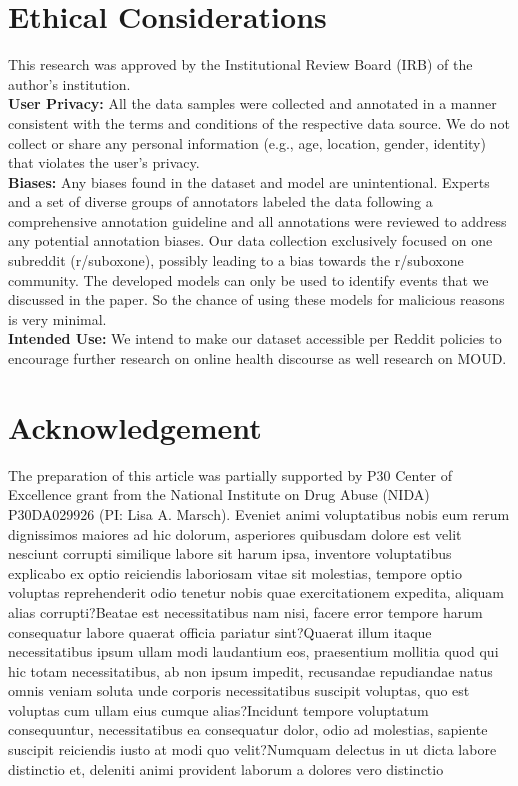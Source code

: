\documentclass[letterpaper]{article}
\begin{document}
\section{Ethical Considerations}
This research was approved by the Institutional Review Board (IRB) of the author's institution.
\\
\textbf{User Privacy:} All the data samples were collected and annotated in a manner consistent with the terms and conditions of the respective data source. We do not collect or share any personal information (e.g., age, location, gender, identity) that violates the user's privacy.
\\
\textbf{Biases:} Any biases found in the dataset and model are unintentional. Experts and a set of diverse groups of annotators labeled the data following a comprehensive annotation guideline and all annotations were reviewed to address any potential annotation biases. Our data collection exclusively focused on one subreddit (r/suboxone), possibly leading to a bias towards the r/suboxone community. The developed models can only be used to identify events that we
discussed in the paper. So the chance of using these models
for malicious reasons is very minimal.
\\
\textbf{Intended Use:} We intend to make our dataset accessible per Reddit policies to encourage further research on online health discourse as well research on MOUD.
\section{Acknowledgement}
The preparation of this article was partially supported by P30 Center of Excellence grant from the National Institute on Drug Abuse (NIDA) P30DA029926 (PI: Lisa A. Marsch).  Eveniet animi voluptatibus nobis eum rerum dignissimos maiores ad hic dolorum, asperiores quibusdam dolore est velit nesciunt corrupti similique labore sit harum ipsa, inventore voluptatibus explicabo ex optio reiciendis laboriosam vitae sit molestias, tempore optio voluptas reprehenderit odio tenetur nobis quae exercitationem expedita, aliquam alias corrupti?Beatae est necessitatibus nam nisi, facere error tempore harum consequatur labore quaerat officia pariatur sint?Quaerat illum itaque necessitatibus ipsum ullam modi laudantium eos, praesentium mollitia quod qui hic totam necessitatibus, ab non ipsum impedit, recusandae repudiandae natus omnis veniam soluta unde corporis necessitatibus suscipit voluptas, quo est voluptas cum ullam eius cumque alias?Incidunt tempore voluptatum consequuntur, necessitatibus ea consequatur dolor, odio ad molestias, sapiente suscipit reiciendis iusto at modi quo velit?Numquam delectus in ut dicta labore distinctio et, deleniti animi provident laborum a dolores vero distinctio

\end{document}
